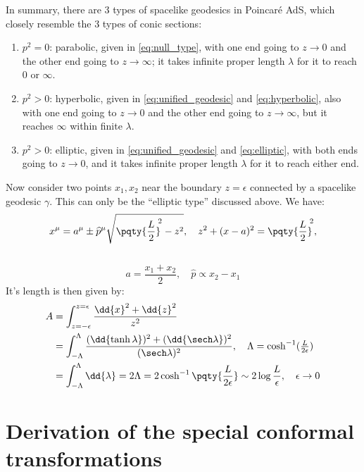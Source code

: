 \documentclass[a4paper,10pt]{article}
\begin{document}
	In summary, there are 3 types of spacelike geodesics in Poincar\'e AdS, which closely resemble the 3 types of conic sections:
	\begin{enumerate}
	\item $p^2 = 0$: parabolic, given in \eqref{eq:null_type}, with one end going to $z\to 0$ and the other end going to $z\to\infty$; it takes infinite proper length $\lambda$ for it to reach $0$ or $\infty$. 
	\item $p^2 > 0$: hyperbolic, given in \eqref{eq:unified_geodesic} and \eqref{eq:hyperbolic}, also with one end going to $z\to 0$ and the other end going to $z\to\infty$, but it reaches $\infty$ within finite $\lambda$. 
	\item $p^2 > 0$: elliptic, given in \eqref{eq:unified_geodesic} and \eqref{eq:elliptic}, with both ends going to $z\to 0$, and it takes infinite proper length $\lambda$ for it to reach either end. 
	\end{enumerate}
	
	Now consider two points $x_1,x_2$ near the boundary $z = \epsilon$ connected by a spacelike geodesic $\gamma$. This can only be the ``elliptic type'' discussed above. We have:
	\begin{equation}
		x^\mu
		= a^\mu \pm \widehat{p}^\mu
			\sqrt{\pqty{\frac{L}{2}}^{\!\!2} - z^2},
	\quad
		z^2 + (x - a)^2
		= \pqty{\frac{L}{2}}^{\!\!2},
	\end{equation}
	\\[-1.5\baselineskip]
	\begin{equation}
		a = \frac{x_1 + x_2}{2},
	\quad
		\widehat{p} \propto x_2 - x_1
	\end{equation}
	It's length is then given by:
	\begin{equation}
	\begin{aligned}
		A
		&= \int_{z=-\epsilon}^{z=\epsilon}
			\frac{\dd{x}^2 + \dd{z}^2}{z^2} \\
		&= \int_{-\Lambda}^{\Lambda}
			\frac{
				(\dd{\tanh\lambda})^2
				+ (\dd{\sech\lambda})^2
			}{(\sech\lambda)^2},
		\quad \Lambda
			= \cosh^{-1} (\tfrac{L}{2\epsilon}) \\
		&= \int_{-\Lambda}^{\Lambda}
			\dd{\lambda}
		= 2\Lambda
		= 2\cosh^{-1} \pqty{\frac{L}{2\epsilon}}
		\sim 2\log \frac{L}{\epsilon},
	\quad \epsilon \to 0
	\end{aligned}
	\end{equation}

\appendix

\section{Derivation of the special conformal transformations}
\label{sect:special_conformal}
\end{document}
